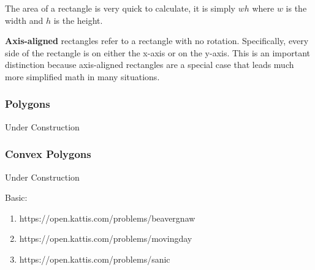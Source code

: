 The area of a rectangle is very quick to calculate, it is simply $wh$ where $w$ is the width and $h$ is the height.

\textbf{Axis-aligned} rectangles refer to a rectangle with no rotation. Specifically, every side of the rectangle is on either the x-axis or on the y-axis. This is an important distinction because axis-aligned rectangles are a special case that leads much more simplified math in many situations.

\subsubsection{Polygons}

Under Construction

\subsubsection{Convex Polygons}

Under Construction

\hrulefill

Basic:
\begin{enumerate}
\item https://open.kattis.com/problems/beavergnaw
\item https://open.kattis.com/problems/movingday
\item https://open.kattis.com/problems/sanic
\end{enumerate}
